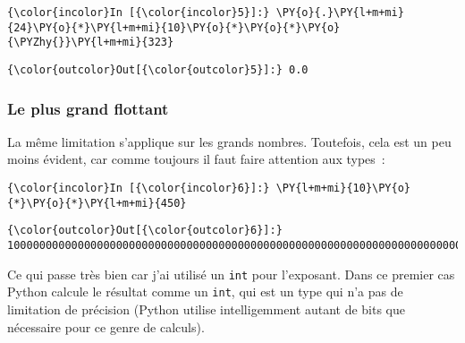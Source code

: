     \begin{Verbatim}[commandchars=\\\{\},frame=single,framerule=0.3mm,rulecolor=\color{cellframecolor}]
{\color{incolor}In [{\color{incolor}5}]:} \PY{o}{.}\PY{l+m+mi}{24}\PY{o}{*}\PY{l+m+mi}{10}\PY{o}{*}\PY{o}{*}\PY{o}{\PYZhy{}}\PY{l+m+mi}{323}
\end{Verbatim}


\begin{Verbatim}[commandchars=\\\{\},frame=single,framerule=0.3mm,rulecolor=\color{cellframecolor}]
{\color{outcolor}Out[{\color{outcolor}5}]:} 0.0
\end{Verbatim}
            
    \hypertarget{le-plus-grand-flottant}{%
\subsubsection{Le plus grand flottant}\label{le-plus-grand-flottant}}

    La même limitation s'applique sur les grands nombres. Toutefois, cela
est un peu moins évident, car comme toujours il faut faire attention aux
types~:

    \begin{Verbatim}[commandchars=\\\{\},frame=single,framerule=0.3mm,rulecolor=\color{cellframecolor}]
{\color{incolor}In [{\color{incolor}6}]:} \PY{l+m+mi}{10}\PY{o}{*}\PY{o}{*}\PY{l+m+mi}{450}
\end{Verbatim}


\begin{Verbatim}[commandchars=\\\{\},frame=single,framerule=0.3mm,rulecolor=\color{cellframecolor}]
{\color{outcolor}Out[{\color{outcolor}6}]:} 1000000000000000000000000000000000000000000000000000000000000000000000000000000000000000000000000000000000000000000000000000000000000000000000000000000000000000000000000000000000000000000000000000000000000000000000000000000000000000000000000000000000000000000000000000000000000000000000000000000000000000000000000000000000000000000000000000000000000000000000000000000000000000000000000000000000000000000000000000000000000000000000000000000000000000000
\end{Verbatim}
            
    Ce qui passe très bien car j'ai utilisé un \texttt{int} pour l'exposant.
Dans ce premier cas Python calcule le résultat comme un \texttt{int},
qui est un type qui n'a pas de limitation de précision (Python utilise
intelligemment autant de bits que nécessaire pour ce genre de calculs).

